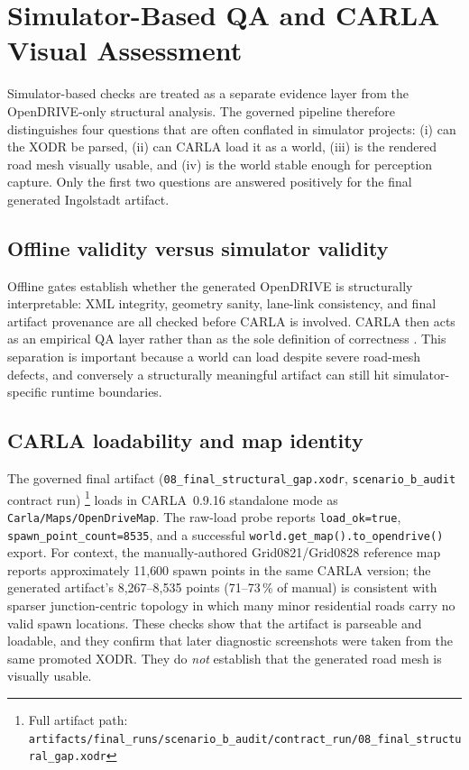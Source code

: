 \section{Simulator-Based QA and CARLA Visual Assessment}
\label{sec:simqa}

Simulator-based checks are treated as a separate evidence layer from the OpenDRIVE-only structural analysis. The governed pipeline therefore distinguishes four questions that are often conflated in simulator projects: (i) can the XODR be parsed, (ii) can CARLA load it as a world, (iii) is the rendered road mesh visually usable, and (iv) is the world stable enough for perception capture. Only the first two questions are answered positively for the final generated Ingolstadt artifact.

\subsection{Offline validity versus simulator validity}
Offline gates establish whether the generated OpenDRIVE is structurally interpretable: XML integrity, geometry sanity, lane-link consistency, and final artifact provenance are all checked before CARLA is involved. CARLA then acts as an empirical QA layer rather than as the sole definition of correctness \cite{carla_opendrive_standalone}. This separation is important because a world can load despite severe road-mesh defects, and conversely a structurally meaningful artifact can still hit simulator-specific runtime boundaries.

\subsection{CARLA loadability and map identity}
The governed final artifact (\texttt{08\_final\_structural\_gap.xodr}, \texttt{scenario\_b\_audit} contract run)%
\footnote{Full artifact path: \texttt{artifacts/final\_runs/scenario\_b\_audit/}\allowbreak\texttt{contract\_run/08\_final\_structural\_gap.xodr}}
loads in CARLA~0.9.16 standalone mode as \texttt{Carla/Maps/OpenDriveMap}. The raw-load probe reports \texttt{load\_ok=true}, \texttt{spawn\_point\_count=8535}, and a successful \texttt{world.get\_map().}\allowbreak\texttt{to\_opendrive()} export. For context, the manually-authored Grid0821/Grid0828 reference map reports approximately 11{,}600 spawn points in the same CARLA version; the generated artifact's 8{,}267--8{,}535 points (71--73\,\% of manual) is consistent with sparser junction-centric topology in which many minor residential roads carry no valid spawn locations. These checks show that the artifact is parseable and loadable, and they confirm that later diagnostic screenshots were taken from the same promoted XODR. They do \emph{not} establish that the generated road mesh is visually usable.

